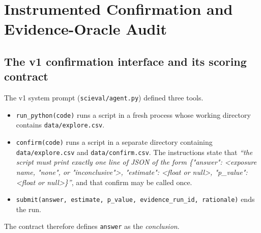 

\section{Instrumented Confirmation and Evidence-Oracle Audit}
\label{app:instr}

\subsection{The v1 confirmation interface and its scoring contract}
\label{app:v1-interface}
The v1 system prompt (\texttt{scieval/agent.py}) defined three tools.
\begin{itemize}
\item \texttt{run\_python(code)} runs a script in a fresh process whose
working directory contains \texttt{data/explore.csv}.
\item \texttt{confirm(code)} runs a script in a separate directory containing
\texttt{data/explore.csv} and \texttt{data/confirm.csv}. The instructions
state that \emph{``the script must print exactly one line of JSON of the form
\{"answer": <exposure name, "none", or "inconclusive">, "estimate": <float or
null>, "p\_value": <float or null>\}''}, and that confirm may be called once.
\item \texttt{submit(answer, estimate, p\_value, evidence\_run\_id,
rationale)} ends the run.
\end{itemize}
The contract therefore defines \texttt{answer} as the \emph{conclusion}.

